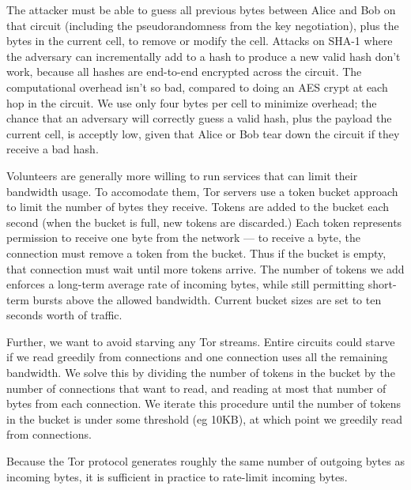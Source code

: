 \documentclass[times,10pt,twocolumn]{article}
\begin{document}
The attacker must be able to guess all previous bytes between Alice
and Bob on that circuit (including the pseudorandomness from the key
negotiation), plus the bytes in the current cell, to remove or modify the
cell. Attacks on SHA-1 where the adversary can incrementally add to a
hash to produce a new valid hash don't work,
because all hashes are end-to-end encrypted across the circuit.
The computational overhead isn't so bad, compared to doing an AES
crypt at each hop in the circuit. We use only four bytes per cell to
minimize overhead; the chance that an adversary will correctly guess a
valid hash, plus the payload the current cell, is acceptly low, given
that Alice or Bob tear down the circuit if they receive a bad hash.


Volunteers are generally more willing to run services that can limit
their bandwidth usage.  To accomodate them, Tor servers use a token
bucket approach to limit the number of bytes they
receive. Tokens are added to the bucket each second (when the bucket is
full, new tokens are discarded.) Each token represents permission to
receive one byte from the network --- to receive a byte, the connection
must remove a token from the bucket. Thus if the bucket is empty, that
connection must wait until more tokens arrive. The number of tokens we
add enforces a long-term average rate of incoming bytes, while still
permitting short-term bursts above the allowed bandwidth. Current bucket
sizes are set to ten seconds worth of traffic.

Further, we want to avoid starving any Tor streams. Entire circuits
could starve if we read greedily from connections and one connection
uses all the remaining bandwidth. We solve this by dividing the number
of tokens in the bucket by the number of connections that want to read,
and reading at most that number of bytes from each connection. We iterate
this procedure until the number of tokens in the bucket is under some
threshold (eg 10KB), at which point we greedily read from connections.

Because the Tor protocol generates roughly the same number of outgoing
bytes as incoming bytes, it is sufficient in practice to rate-limit
incoming bytes.
\end{document}
